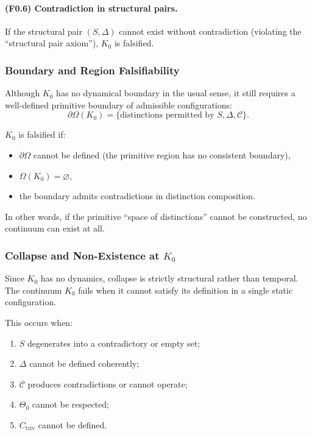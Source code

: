 \paragraph{(F0.6) Contradiction in structural pairs.}  
If the structural pair $(S,\Delta)$ cannot exist without contradiction
(violating the ``structural pair axiom''), $K_0$ is falsified.



\subsubsection{Boundary and Region Falsifiability}

Although $K_0$ has no dynamical boundary in the usual sense,
it still requires a well-defined primitive boundary of admissible 
configurations:
\[
\partial\Omega(K_0) = \{ \text{distinctions permitted by } S,\Delta,\mathcal{C} \}.
\]

$K_0$ is falsified if:

\begin{itemize}
    \item $\partial\Omega$ cannot be defined (the primitive region has no
          consistent boundary),
    \item $\Omega(K_0)=\varnothing$,
    \item the boundary admits contradictions in distinction composition.
\end{itemize}

In other words, if the primitive “space of distinctions” cannot be
constructed, no continuum can exist at all.



\subsubsection{Collapse and Non-Existence at \texorpdfstring{$K_0$}{K_0}}

Since $K_0$ has no dynamics, collapse is strictly structural rather than
temporal.
The continuum $K_0$ fails when it cannot satisfy its definition in a
single static configuration.

This occurs when:

\begin{enumerate}
    \item $S$ degenerates into a contradictory or empty set;
    \item $\Delta$ cannot be defined coherently;
    \item $\mathcal{C}$ produces contradictions or cannot operate;
    \item $\Theta_0$ cannot be respected;
    \item $C_{\mathrm{triv}}$ cannot be defined.
\end{enumerate}

